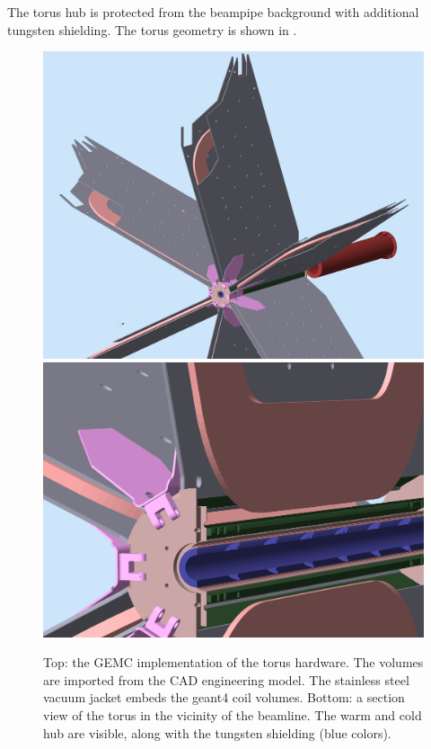 The torus hub is protected from the beampipe background with additional tungsten shielding.
The torus geometry is shown in .

\begin{figure}
	\centering
	\includegraphics[width=0.95\columnwidth,keepaspectratio]{img/torusGeometry.png}
	\includegraphics[width=0.95\columnwidth,keepaspectratio]{img/torusDetail.png}
	\caption{Top: the GEMC implementation of the torus hardware. The volumes are imported from the CAD engineering model.
            The stainless steel vacuum jacket embeds the geant4 coil volumes.
				Bottom: a section view of the torus in the vicinity of the beamline. The warm and cold hub are visible, along with the
				tungsten shielding (blue colors).}
	\label{fig:torus}
\end{figure}



